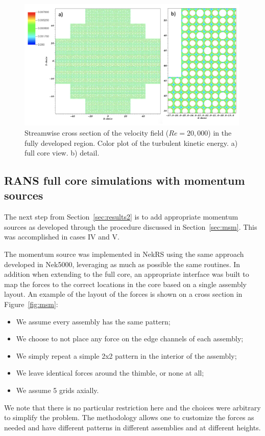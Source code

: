 \begin{figure}[!ht]
\centering
\includegraphics[width=0.99\textwidth]{./figures/periodic_tke.png}
\caption{Streamwise cross section of the velocity field ($Re=20,000$) in the fully developed region. Color plot of the turbulent kinetic energy. a) full core view. b) detail. }
\label{fig:tke}
\end{figure}

\subsection{RANS full core simulations with momentum sources}
\label{sec:results3}

The next step from Section~\ref{sec:results2} is to add appropriate momentum sources as developed through the procedure discussed in Section~\ref{sec:msm}. This was accomplished in cases IV and V.

 The momentum source was implemented in NekRS using the same approach developed in Nek5000, leveraging as much as possible the same routines. In addition when extending to the full core, an appropriate interface was built to map the forces to the correct locations in the core based on a single assembly layout. An example of the layout of the forces is shown on a cross section in Figure~\ref{fig:msm}:
\begin{itemize}
    \item We assume every assembly has the same pattern;
    \item We choose to not place any force on the edge channels of each assembly;
    \item We simply repeat a simple 2x2 pattern in the interior of the assembly;
    \item We leave identical forces around the thimble, or none at all;
    \item We assume 5 grids axially.
\end{itemize}
We note that there is no particular restriction here and the choices were arbitrary to simplify the problem. The methodology allows one to customize the forces as needed and have different patterns in different assemblies and at different heights.

